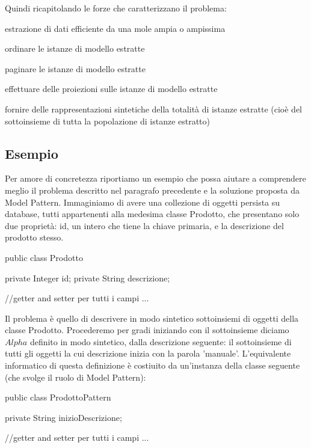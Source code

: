 Quindi ricapitolando le forze che caratterizzano il problema:
\begin{enumerate*}
  \item estrazione di dati efficiente da una mole ampia o ampissima
  \item ordinare  le istanze di modello estratte
  \item paginare  le istanze di modello estratte
  \item effettuare delle proiezioni sulle istanze di modello estratte
  \item fornire delle rappresentazioni sintetiche della totalità di istanze estratte (cioè del sottoinsieme di tutta la popolazione di istanze estratto)
\end{enumerate*}

\subsection{Esempio}
Per amore di concretezza riportiamo un esempio che possa aiutare a comprendere meglio il problema descritto nel paragrafo precedente e la soluzione proposta da Model Pattern. Immaginiamo di avere una collezione di oggetti persista su database, tutti appartenenti alla medesima classe Prodotto, che presentano solo due proprietà: id, un intero che tiene la chiave primaria, e la descrizione del prodotto stesso. 

\begin{java}
public class Prodotto {
    
    private Integer id;
    private String descrizione;

    //getter and setter per tutti i campi
    ...
}
\end{java}

Il problema è quello di descrivere in modo sintetico sottoinsiemi di oggetti della classe Prodotto. Procederemo per gradi iniziando con il sottoinsieme diciamo $Alpha$ definito in modo sintetico, dalla descrizione seguente: il sottoinsieme di tutti gli oggetti la cui descrizione inizia con la parola 'manuale'. L'equivalente informatico di questa definizione è costiuito da un'instanza della classe seguente (che svolge il ruolo di Model Pattern):

\begin{java}
public class ProdottoPattern  {
    
    private String inizioDescrizione;

    //getter and setter per tutti i campi
    ...
}
\end{java}


